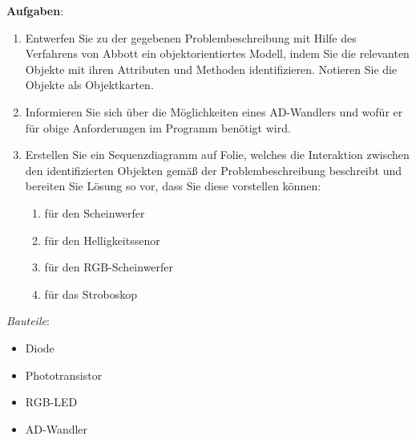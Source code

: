 \documentclass[11pt, a4paper]{article}
\begin{document}
\newpage
\textbf{Aufgaben}:
\begin{enumerate}
\item Entwerfen Sie zu der gegebenen Problembeschreibung mit Hilfe des Verfahrens von Abbott ein objektorientiertes Modell, indem Sie die relevanten Objekte mit ihren Attributen und Methoden identifizieren. Notieren Sie die Objekte als Objektkarten.


\item Informieren Sie sich über die Möglichkeiten eines AD-Wandlers und wofür er für obige Anforderungen im Programm benötigt wird.

\item Erstellen Sie ein Sequenzdiagramm auf Folie, welches die Interaktion zwischen den identifizierten Objekten gemäß der Problembeschreibung beschreibt und bereiten Sie Lösung so vor, dass Sie diese vorstellen können:
\begin{enumerate}
	\item für den Scheinwerfer
	\item für den Helligkeitssenor
	\item für den RGB-Scheinwerfer
	\item für das Stroboskop
\end{enumerate}
\end{enumerate}

\vfill
\emph{Bauteile}:
\begin{itemize}
\item Diode
\item Phototransistor
\item RGB-LED
\item AD-Wandler
\end{itemize}

\end{document}
